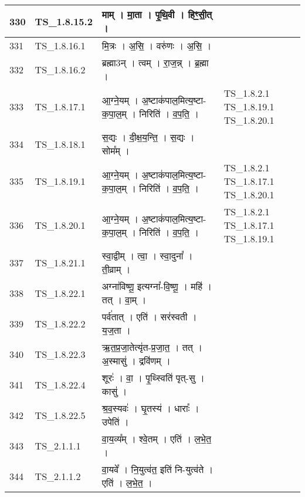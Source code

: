 \documentclass[17pt]{extarticle}
\begin{document}
\begin{longtable}{||p{0.4in}||p{0.9in}||p{4.0in}||p{0.9in}||}
        \hline
            330 & TS\_1.8.15.2 & माम्   ।   मा॒ता   ।   पृ॒थि॒वी   ।   हिꣳ॒॒सी॒त्   ।    &      \\
        \hline
            331 & TS\_1.8.16.1 & मि॒त्रः   ।   अ॒सि॒   ।   वरु॑णः   ।   अ॒सि॒   ।    &      \\
        \hline
            332 & TS\_1.8.16.2 & ब्रह्मा3न्   ।   त्वम्   ।   रा॒ज॒न्न्   ।   ब्र॒ह्मा   ।    &      \\
        \hline
            333 & TS\_1.8.17.1 & आ॒ग्ने॒यम्   ।   अ॒ष्टाक॑पाल॒मित्य॒ष्टा{-}क॒पा॒ल॒म्   ।   निरिति॑   ।   व॒प॒ति॒   ।    & TS\_1.8.2.1  TS\_1.8.19.1 TS\_1.8.20.1       \\
        \hline
            334 & TS\_1.8.18.1 & स॒द्यः   ।   दी॒क्ष॒य॒न्ति॒   ।   स॒द्यः   ।   सोम᳚म्   ।    &      \\
        \hline
            335 & TS\_1.8.19.1 & आ॒ग्ने॒यम्   ।   अ॒ष्टाक॑पाल॒मित्य॒ष्टा{-}क॒पा॒ल॒म्   ।   निरिति॑   ।   व॒प॒ति॒   ।    & TS\_1.8.2.1 TS\_1.8.17.1  TS\_1.8.20.1       \\
        \hline
            336 & TS\_1.8.20.1 & आ॒ग्ने॒यम्   ।   अ॒ष्टाक॑पाल॒मित्य॒ष्टा{-}क॒पा॒ल॒म्   ।   निरिति॑   ।   व॒प॒ति॒   ।    & TS\_1.8.2.1 TS\_1.8.17.1 TS\_1.8.19.1        \\
        \hline
            337 & TS\_1.8.21.1 & स्वा॒द्वीम्   ।   त्वा॒   ।   स्वा॒दुना᳚   ।   ती॒व्राम्   ।    &      \\
        \hline
            338 & TS\_1.8.22.1 & अग्ना॑विष्णू॒ इत्यग्ना᳚{-}वि॒ष्णू॒   ।   महि॑   ।   तत्   ।   वा॒म्   ।    &      \\
        \hline
            339 & TS\_1.8.22.2 & पर्व॑तात्   ।   एति॑   ।   सर॑स्वती   ।   य॒ज॒ता   ।    &      \\
        \hline
            340 & TS\_1.8.22.3 & ऋ॒त॒प्र॒जा॒तेत्यृ॑त{-}प्र॒जा॒त॒   ।   तत्   ।   अ॒स्मासु॑   ।   द्रवि॑णम्   ।    &      \\
        \hline
            341 & TS\_1.8.22.4 & शूरः॑   ।   वा॒   ।   पृ॒थ्स्विति॑ पृत्{-}सु   ।   कासु॑   ।    &      \\
        \hline
            342 & TS\_1.8.22.5 & श्र॒व॒स्यवः॑   ।   घृ॒तस्य॑   ।   धाराः᳚   ।   उपेति॑   ।    &      \\
        \hline
            343 & TS\_2.1.1.1 & वा॒य॒व्य᳚म्   ।   श्वे॒तम्   ।   एति॑   ।   ल॒भे॒त॒   ।    &      \\
        \hline
            344 & TS\_2.1.1.2 & वा॒यवे᳚   ।   नि॒युत्व॑त॒ इति॑ नि{-}युत्व॑ते   ।   एति॑   ।   ल॒भे॒त॒   ।    &      \\

\end{longtable}
\end{document}
